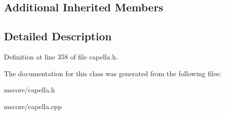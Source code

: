 \subsection*{Additional Inherited Members}


\subsection{Detailed Description}


Definition at line 358 of file capella.\+h.



The documentation for this class was generated from the following files\+:\begin{DoxyCompactItemize}
\item 
mscore/capella.\+h\item 
mscore/capella.\+cpp\end{DoxyCompactItemize}
